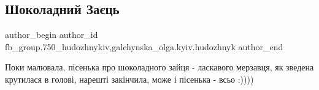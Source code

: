  
 
 
 
 

\subsection{Шоколадний Заєць}
\label{sec:25_03_2018.fb.fb_group.750_hudozhnykiv.1.shokolad_zajec}
 
\ifcmt
 author_begin
   author_id fb_group.750_hudozhnykiv,galchynska_olga.kyiv.hudozhnyk
 author_end
\fi

Поки малювала, пісенька про шоколадного зайця - ласкавого мерзавця, як зведена
крутилася в голові, нарешті закінчила, може і пісенька - всьо :))))

